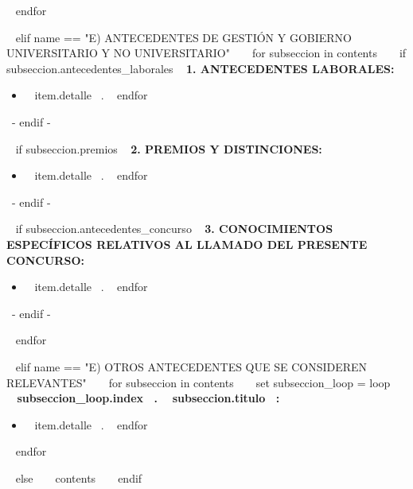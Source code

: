   ~{ endfor }~
  \espacioEntreSecciones{}


~{ elif name == "E) ANTECEDENTES DE GESTIÓN Y GOBIERNO UNIVERSITARIO Y NO UNIVERSITARIO" }~
  ~{ for subseccion in contents }~
    ~{ if subseccion.antecedentes_laborales }~
      \textbf{1. ANTECEDENTES LABORALES:}
      \begin{itemize}
      ~{ for item in subseccion.antecedentes_laborales }~
        \item ~{{ item.detalle }}~.
        \espacioEntreItems{}
      ~{ endfor }~
      \end{itemize}
      \espacioEntreSubSecciones{}
    ~{- endif -}~

    ~{ if subseccion.premios }~
      \textbf{2. PREMIOS Y DISTINCIONES:}
      \begin{itemize}
      ~{ for item in subseccion.premios }~
        \item ~{{ item.detalle }}~.
        \espacioEntreItems{}
      ~{ endfor }~
      \end{itemize}
      \espacioEntreSubSecciones{}
    ~{- endif -}~

    ~{ if subseccion.antecedentes_concurso }~
      \textbf{3. CONOCIMIENTOS ESPECÍFICOS RELATIVOS AL LLAMADO DEL PRESENTE CONCURSO:}
      \begin{itemize}
      ~{ for item in subseccion.antecedentes_concurso }~
        \item ~{{ item.detalle }}~.
        \espacioEntreItems{}
      ~{ endfor }~
      \end{itemize}
      \espacioEntreSubSecciones{}
    ~{- endif -}~

  ~{ endfor }~
  \espacioEntreSecciones{}


~{ elif name == "E) OTROS ANTECEDENTES QUE SE CONSIDEREN RELEVANTES" }~
  ~{ for subseccion in contents }~
    ~{ set subseccion_loop = loop }~
    \textbf{~{{ subseccion_loop.index }}~. ~{{ subseccion.titulo }}~:}
    \begin{itemize}
    ~{ for item in subseccion.antecedentes }~
      \item ~{{ item.detalle }}~.
      \espacioEntreItems{}
    ~{ endfor }~
    \end{itemize}
    \espacioEntreSubSecciones{}

  ~{ endfor }~
  \espacioEntreSecciones{}


~{ else }~
  ~{{ contents }}~
  \bigskip
~{ endif }~

